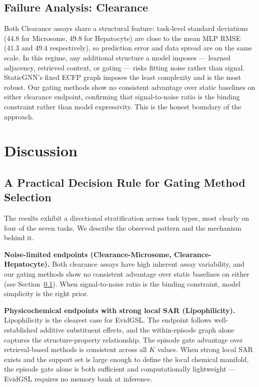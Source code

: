 \documentclass{article}
\theoremstyle{plain}
\theoremstyle{definition}
\theoremstyle{remark}
\begin{document}
\subsection{Failure Analysis: Clearance}
\label{sec:failure}

Both Clearance assays share a structural feature: task-level standard deviations (44.8 for Microsome, 49.8 for Hepatocyte) are close to the mean MLP RMSE (41.3 and 49.4 respectively), so prediction error and data spread are on the same scale. In this regime, any additional structure a model imposes — learned adjacency, retrieved context, or gating — risks fitting noise rather than signal. StaticGNN's fixed ECFP graph imposes the least complexity and is the most robust. Our gating methods show no consistent advantage over static baselines on either clearance endpoint, confirming that signal-to-noise ratio is the binding constraint rather than model expressivity. This is the honest boundary of the approach.

\section{Discussion}
\label{sec:discussion}

\subsection{A Practical Decision Rule for Gating Method Selection}

The results exhibit a directional stratification across task types, most clearly on four of the seven tasks. We describe the observed pattern and the mechanism behind it.

\textbf{Noise-limited endpoints (Clearance-Microsome, Clearance-Hepatocyte).} Both clearance assays have high inherent assay variability, and our gating methods show no consistent advantage over static baselines on either (see Section~\ref{sec:failure}). When signal-to-noise ratio is the binding constraint, model simplicity is the right prior.

\textbf{Physicochemical endpoints with strong local SAR (Lipophilicity).} Lipophilicity is the clearest case for EvidGSL. The endpoint follows well-established additive substituent effects, and the within-episode graph alone captures the structure-property relationship. The episode gate advantage over retrieval-based methods is consistent across all $K$ values. When strong local SAR exists and the support set is large enough to define the local chemical manifold, the episode gate alone is both sufficient and computationally lightweight — EvidGSL requires no memory bank at inference.
\end{document}
